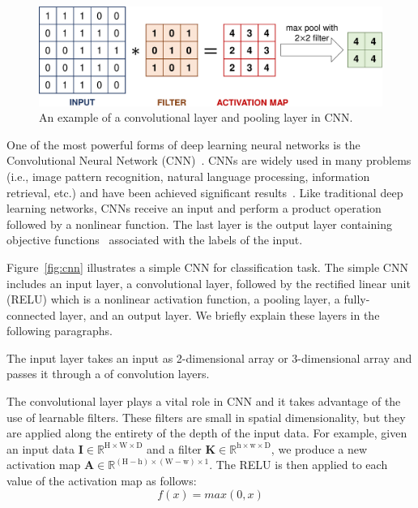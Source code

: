 \begin{figure}[t!]
	\center
	\includegraphics[scale=0.3]{figs/filter_pooling.pdf}
	\caption{An example of a convolutional layer and pooling layer in CNN.}
	\label{fig:filter}
\end{figure}

One of the most powerful forms of deep learning neural networks is the Convolutional Neural Network (CNN)~\cite{lecun2015deep}. CNNs are widely used in many problems (i.e., image pattern recognition, natural language processing, information retrieval, etc.) and have been achieved significant results~\cite{karpathy2014large, lawrence1997face, krizhevsky2012imagenet}. Like traditional deep learning networks, CNNs receive an input and perform a product operation followed by a nonlinear function. The last layer is the output layer containing objective functions~\cite{zhao2017loss} associated with the labels of the input.

Figure~\ref{fig:cnn} illustrates a simple CNN for classification task. The simple CNN includes an input layer, a convolutional layer, followed by the rectified linear unit (RELU) which is a nonlinear activation function, a pooling layer, a fully-connected layer, and an output layer. We briefly explain these layers in the following paragraphs. 

The input layer takes an input as 2-dimensional array or 3-dimensional array and passes it through a of convolution layers.

The convolutional layer plays a vital role in CNN and it takes advantage of the use of learnable filters. These filters are small in spatial dimensionality, but they are applied along the entirety of the depth of the input data. For example, given an input data $\textbf{I} \in \mathbb{R}^{\text{H} \times \text{W} \times \text{D}}$ and a filter $\textbf{K} \in \mathbb{R}^{\text{h} \times \text{w} \times \text{D}}$, we produce a new activation map $\textbf{A} \in \mathbb{R}^{(\text{H} - \text{h}) \times (\text{W} - \text{w}) \times 1}$. The RELU is then applied to each value of the activation map as follows:
\begin{equation}
\label{eq:relu}
f(x) = max(0, x)   
\end{equation}

